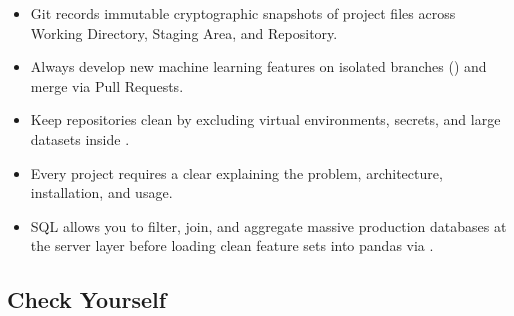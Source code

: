 \begin{takeaways}
\begin{itemize}
    \item Git records immutable cryptographic snapshots of project files across Working Directory, Staging Area, and Repository.
    \item Always develop new machine learning features on isolated branches () and merge via Pull Requests.
    \item Keep repositories clean by excluding virtual environments, secrets, and large datasets inside .
    \item Every project requires a clear  explaining the problem, architecture, installation, and usage.
    \item SQL allows you to filter, join, and aggregate massive production databases at the server layer before loading clean feature sets into pandas via .
\end{itemize}
\end{takeaways}

\subsection{Check Yourself}

